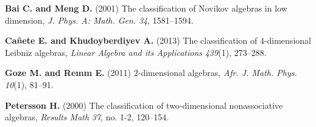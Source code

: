 \documentclass{CUP-JNL-DTM}%
\theoremstyle{definition}
\numberwithin{equation}{section}
\begin{document}
\begin{Backmatter}
\begin{thebibliography}{}
\textbf{Bai C. and Meng D.} (2001) The classification of Novikov algebras in low dimension,  \textit{J. Phys. A: Math. Gen.} \textit{34}, {1581}--{1594}.

\textbf{Ca\~{n}ete E. and Khudoyberdiyev A.} (2013) The classification of $4$-dimensional Leibniz algebras,  \textit{Linear Algebra and its Applications}  \textit{439}(1), {273}--{288}.

\textbf{Goze M. and Remm E.} (2011)  $2$-dimensional algebras,  \textit{Afr. J. Math. Phys.} \textit{10}(1),  {81}--{91}.

\textbf{Petersson H.} (2000) The classification of two-dimensional nonassociative algebras,  \textit{Results Math} \textit{37}, no. 1-2,  {120}--{154}.


\end{thebibliography}

\end{Backmatter}
\end{document}
